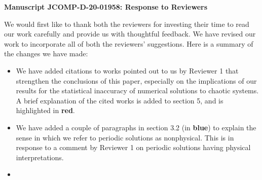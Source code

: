 \documentclass[11pt]{article}
\title{}
\author{}
\date{23rd April 2021}
\newcommand{\reviewerOne}[1]{{\color{burgundy}\textbf{#1}}}
\begin{document}
\begin{center}
		\Large{\textbf{Manuscript JCOMP-D-20-01958: Response to Reviewers}}
\end{center}
\medskip
We would first like to thank both the reviewers for investing their time to read our work carefully and provide us with thoughtful feedback. We have revised our work to incorporate all of both the reviewers' suggestions. Here is a summary of the changes we have made:
\begin{itemize}
    \item We have added citations to works pointed out to us by Reviewer 1 that strengthen the conclusions of this paper, especially on the implications of our results for the statistical inaccuracy of numerical solutions to chaotic systems. A brief explanation of the cited works is added to section 5, and is highlighted in \reviewerOne{red}.
    \item We have added a couple of paragraphs in section 3.2 (in \reviewerOne{blue}) to explain the sense in which we refer to periodic solutions as nonphysical. This is in response to a comment by Reviewer 1 on periodic solutions having physical interpretations.
    \item 
\end{itemize}
\end{document}
